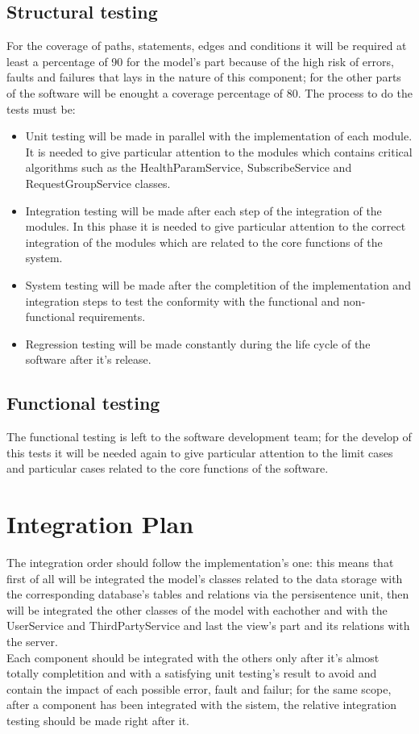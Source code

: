 \subsection{Structural testing}
	For the coverage of paths, statements, edges and conditions it will be required at least a percentage of 90 for the model's part because of the high risk of errors, faults and failures that lays 	in the nature of this component; for the other parts of the software will be enought a coverage percentage of 80. The process to do the tests must be: 
	\begin{itemize}
		\item Unit testing will be made in parallel with the implementation of each module. It is needed to give particular attention to the modules which contains critical algorithms such as the 			HealthParamService, SubscribeService and RequestGroupService classes.
		\item Integration testing will be made after each step of the integration of the modules. In this phase it is needed to give particular attention to the correct integration of the modules 			which are related to the core functions of the system.
		\item System testing will be made after the completition of the implementation and integration steps to test the conformity with the functional and non-functional requirements.
		\item Regression testing will be made constantly during the life cycle of the software after it's release. 
	\end{itemize}
\subsection{Functional testing}
	The functional testing is left to the software development team; for the develop of this tests it will be needed again to give particular attention to the limit cases and particular cases 		related to the core functions of the software.
\section{Integration Plan}
The integration order should follow the implementation's one: this means that first of all will be integrated the model's classes related to the data storage with the corresponding database's tables and relations via the persisentence unit, then will be integrated the other classes of the model with eachother and with the UserService and ThirdPartyService and last the view's part and its relations with the server.\\ 
 Each component should be integrated with the others only after it's almost totally completition and with a satisfying unit testing's result to avoid and contain the impact of each possible error, fault and failur; for the same scope, after a component has been integrated with the sistem, the relative integration testing should be made right after it. 






